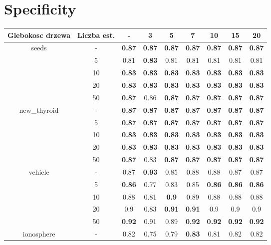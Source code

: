 \documentclass{article}%
\begin{document}
\section*{Specificity}%
\begin{tabular}{c|c|ccccccc}%
\hline%
Glebokosc drzewa&Liczba est.&{-}&3&5&7&10&15&20\\%
\hline%
\multirow{5}{*}{seeds}&{-}&\textbf{0.87}&\textbf{0.87}&\textbf{0.87}&\textbf{0.87}&\textbf{0.87}&\textbf{0.87}&\textbf{0.87}\\%
\cline{2%
-%
9}%
&5&0.81&\textbf{0.83}&0.81&0.81&0.81&0.81&0.81\\%
\cline{2%
-%
9}%
&10&\textbf{0.83}&\textbf{0.83}&\textbf{0.83}&\textbf{0.83}&\textbf{0.83}&\textbf{0.83}&\textbf{0.83}\\%
\cline{2%
-%
9}%
&20&\textbf{0.83}&\textbf{0.83}&\textbf{0.83}&\textbf{0.83}&\textbf{0.83}&\textbf{0.83}&\textbf{0.83}\\%
\cline{2%
-%
9}%
&50&\textbf{0.87}&0.86&\textbf{0.87}&\textbf{0.87}&\textbf{0.87}&\textbf{0.87}&\textbf{0.87}\\%
\hline%
\multirow{5}{*}{new\_thyroid}&{-}&\textbf{0.87}&\textbf{0.87}&\textbf{0.87}&\textbf{0.87}&\textbf{0.87}&\textbf{0.87}&\textbf{0.87}\\%
\cline{2%
-%
9}%
&5&\textbf{0.87}&\textbf{0.87}&\textbf{0.87}&\textbf{0.87}&\textbf{0.87}&\textbf{0.87}&\textbf{0.87}\\%
\cline{2%
-%
9}%
&10&\textbf{0.83}&\textbf{0.83}&\textbf{0.83}&\textbf{0.83}&\textbf{0.83}&\textbf{0.83}&\textbf{0.83}\\%
\cline{2%
-%
9}%
&20&\textbf{0.83}&\textbf{0.83}&\textbf{0.83}&\textbf{0.83}&\textbf{0.83}&\textbf{0.83}&\textbf{0.83}\\%
\cline{2%
-%
9}%
&50&\textbf{0.87}&0.83&\textbf{0.87}&\textbf{0.87}&\textbf{0.87}&\textbf{0.87}&\textbf{0.87}\\%
\hline%
\multirow{5}{*}{vehicle}&{-}&0.87&\textbf{0.93}&0.85&0.88&0.88&0.87&0.87\\%
\cline{2%
-%
9}%
&5&\textbf{0.86}&0.77&0.83&0.85&\textbf{0.86}&\textbf{0.86}&\textbf{0.86}\\%
\cline{2%
-%
9}%
&10&0.88&0.81&\textbf{0.9}&0.89&0.88&0.88&0.88\\%
\cline{2%
-%
9}%
&20&0.9&0.83&\textbf{0.91}&\textbf{0.91}&0.9&0.9&0.9\\%
\cline{2%
-%
9}%
&50&\textbf{0.92}&0.91&0.89&\textbf{0.92}&\textbf{0.92}&\textbf{0.92}&\textbf{0.92}\\%
\hline%
\multirow{5}{*}{ionosphere}&{-}&0.82&0.75&0.79&\textbf{0.83}&0.81&0.82&0.82\\%

\end{tabular}
\end{document}
